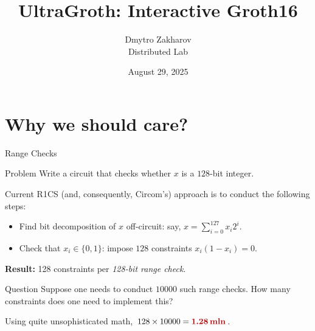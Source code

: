\documentclass{zkdl-presentation-template}
\title[UltraGroth]{UltraGroth: Interactive Groth16}
\author{Dmytro Zakharov \\ Distributed Lab}
\date{August 29, 2025}
\begin{document}

	\section{Why we should care?}

    \begin{frame}{Range Checks}
        \begin{block}{Problem}
            Write a circuit that checks whether $x$ is a $128$-bit integer.\pause
        \end{block}

        Current R1CS (and, consequently, Circom's) approach is to 
        conduct the following steps:
        \begin{itemize}
            \item Find bit decomposition of $x$ off-circuit: say, $x=\sum_{i=0}^{127}x_i2^i$.\pause
            \item Check that $x_i \in \{0,1\}$: impose $128$ constraints $x_i(1-x_i)=0$.\pause
        \end{itemize}

        \textbf{Result:} 128 constraints per \textit{128-bit range check}.\pause

        \begin{alertblock}{Question}
            Suppose one needs to conduct $10000$ such range checks. How many 
            constraints does one need to implement this?\pause
        \end{alertblock}
        
        Using quite unsophisticated math, $128 \times 10000 = \textcolor{red!70!black}{\textbf{1.28\,\text{mln}}}$.
    \end{frame}
\end{document}
